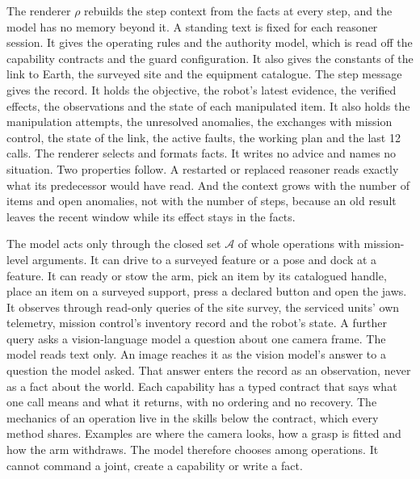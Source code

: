 The renderer $\rho$ rebuilds the step context from the facts at every step, and the model has no memory beyond it. A
standing text is fixed for each reasoner session. It gives the operating rules and the authority model, which is read
off the capability contracts and the guard configuration. It also gives the constants of the link to Earth, the
surveyed site and the equipment catalogue. The step message gives the record. It holds the objective, the robot's latest
evidence, the verified effects, the observations and the state of each manipulated item. It also holds the manipulation
attempts, the unresolved anomalies, the exchanges with mission control, the state of the link, the active faults, the
working plan and the last 12 calls. The renderer selects and formats facts. It writes no advice and names no situation.
Two properties follow. A restarted or replaced reasoner reads exactly what its predecessor would have read. And the
context grows with the number of items and open anomalies, not with the number of steps, because an old result leaves
the recent window while its effect stays in the facts.

The model acts only through the closed set $\mathcal{A}$ of whole operations with mission-level arguments. It can drive
to a surveyed feature or a pose and dock at a feature. It can ready or stow the arm, pick an item by its catalogued
handle, place an item on a surveyed support, press a declared button and open the jaws. It observes through read-only
queries of the site survey, the serviced units' own telemetry, mission control's inventory record and the robot's
state. A further query asks a vision-language model a question about one camera frame. The model reads text only. An
image reaches it as the vision model's answer to a question the model asked. That answer enters the record as an
observation, never as a fact about the world. Each capability has a typed contract that says what one call means and
what it returns, with no ordering and no recovery. The mechanics of an operation live in the skills below the contract,
which every method shares. Examples are where the camera looks, how a grasp is fitted and how the arm withdraws. The
model therefore chooses among operations. It cannot command a joint, create a capability or write a fact.

